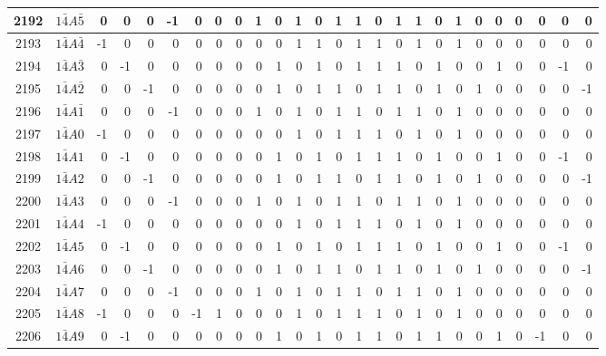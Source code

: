 \documentclass[12 pt]{article}%
\begin{document}
\begin{tiny}
\begin{centering}
\begin{longtable}{|c|c||rrrrrrrrrrrrrrrrrrrrrrrr|}
      \hline
      2192 & $1\bar4A\bar5$ & 0 & 0 & 0 & -1 & 0 & 0 & 0 & 1 & 0 & 1 & 0 & 1 & 1 & 0 & 1 & 1 & 0 & 1 & 0 & 0 & 0 & 0 & 0 & 0 \\
      \hline
      2193 & $1\bar4A\bar4$ & -1 & 0 & 0 & 0 & 0 & 0 & 0 & 0 & 0 & 1 & 1 & 0 & 1 & 1 & 0 & 1 & 0 & 1 & 0 & 0 & 0 & 0 & 0 & 0 \\
      \hline
      2194 & $1\bar4A\bar3$ & 0 & -1 & 0 & 0 & 0 & 0 & 0 & 0 & 1 & 0 & 1 & 0 & 1 & 1 & 1 & 0 & 1 & 0 & 0 & 1 & 0 & 0 & -1 & 0 \\
      \hline
      2195 & $1\bar4A\bar2$ & 0 & 0 & -1 & 0 & 0 & 0 & 0 & 0 & 1 & 0 & 1 & 1 & 0 & 1 & 1 & 0 & 1 & 0 & 1 & 0 & 0 & 0 & 0 & -1 \\
      \hline
      2196 & $1\bar4A\bar1$ & 0 & 0 & 0 & -1 & 0 & 0 & 0 & 1 & 0 & 1 & 0 & 1 & 1 & 0 & 1 & 1 & 0 & 1 & 0 & 0 & 0 & 0 & 0 & 0 \\
      \hline
      2197 & $1\bar4A0$ & -1 & 0 & 0 & 0 & 0 & 0 & 0 & 0 & 0 & 1 & 0 & 1 & 1 & 1 & 0 & 1 & 0 & 1 & 0 & 0 & 0 & 0 & 0 & 0 \\
      \hline
      2198 & $1\bar4A1$ & 0 & -1 & 0 & 0 & 0 & 0 & 0 & 0 & 1 & 0 & 1 & 0 & 1 & 1 & 1 & 0 & 1 & 0 & 0 & 1 & 0 & 0 & -1 & 0 \\
      \hline
      2199 & $1\bar4A2$ & 0 & 0 & -1 & 0 & 0 & 0 & 0 & 0 & 1 & 0 & 1 & 1 & 0 & 1 & 1 & 0 & 1 & 0 & 1 & 0 & 0 & 0 & 0 & -1 \\
      \hline
      2200 & $1\bar4A3$ & 0 & 0 & 0 & -1 & 0 & 0 & 0 & 1 & 0 & 1 & 0 & 1 & 1 & 0 & 1 & 1 & 0 & 1 & 0 & 0 & 0 & 0 & 0 & 0 \\
      \hline
      2201 & $1\bar4A4$ & -1 & 0 & 0 & 0 & 0 & 0 & 0 & 0 & 0 & 1 & 0 & 1 & 1 & 1 & 0 & 1 & 0 & 1 & 0 & 0 & 0 & 0 & 0 & 0 \\
      \hline
      2202 & $1\bar4A5$ & 0 & -1 & 0 & 0 & 0 & 0 & 0 & 0 & 1 & 0 & 1 & 0 & 1 & 1 & 1 & 0 & 1 & 0 & 0 & 1 & 0 & 0 & -1 & 0 \\
      \hline
      2203 & $1\bar4A6$ & 0 & 0 & -1 & 0 & 0 & 0 & 0 & 0 & 1 & 0 & 1 & 1 & 0 & 1 & 1 & 0 & 1 & 0 & 1 & 0 & 0 & 0 & 0 & -1 \\
      \hline
      2204 & $1\bar4A7$ & 0 & 0 & 0 & -1 & 0 & 0 & 0 & 1 & 0 & 1 & 0 & 1 & 1 & 0 & 1 & 1 & 0 & 1 & 0 & 0 & 0 & 0 & 0 & 0 \\
      \hline
      2205 & $1\bar4A8$ & -1 & 0 & 0 & 0 & -1 & 1 & 0 & 0 & 0 & 1 & 0 & 1 & 1 & 1 & 0 & 1 & 0 & 1 & 0 & 0 & 0 & 0 & 0 & 0 \\
      \hline
      2206 & $1\bar4A9$ & 0 & -1 & 0 & 0 & 0 & 0 & 0 & 0 & 1 & 0 & 1 & 0 & 1 & 1 & 0 & 1 & 1 & 0 & 0 & 1 & 0 & -1 & 0 & 0 \\

\end{longtable}
\end{centering}
\end{tiny}
\end{document}
